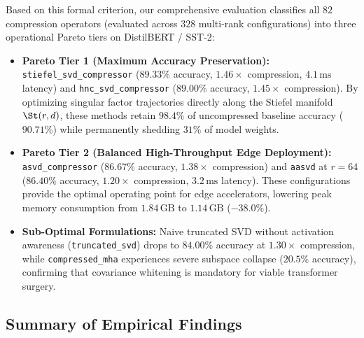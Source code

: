 Based on this formal criterion, our comprehensive evaluation classifies all $82$ compression operators (evaluated across $328$ multi-rank configurations) into three operational Pareto tiers on DistilBERT / SST-2:
\begin{itemize}
    \item \textbf{Pareto Tier 1 (Maximum Accuracy Preservation):} \texttt{stiefel\_svd\_compressor} ($89.33\%$ accuracy, $1.46\times$ compression, $4.1\,\text{ms}$ latency) and \texttt{hnc\_svd\_compressor} ($89.00\%$ accuracy, $1.45\times$ compression). By optimizing singular factor trajectories directly along the Stiefel manifold $\St(r, d)$, these methods retain $98.4\%$ of uncompressed baseline accuracy ($90.71\%$) while permanently shedding $31\%$ of model weights.
    \item \textbf{Pareto Tier 2 (Balanced High-Throughput Edge Deployment):} \texttt{asvd\_compressor} ($86.67\%$ accuracy, $1.38\times$ compression) and \texttt{aasvd} at $r=64$ ($86.40\%$ accuracy, $1.20\times$ compression, $3.2\,\text{ms}$ latency). These configurations provide the optimal operating point for edge accelerators, lowering peak memory consumption from $1.84\,\text{GB}$ to $1.14\,\text{GB}$ ($-38.0\%$).
    \item \textbf{Sub-Optimal Formulations:} Naive truncated SVD without activation awareness (\texttt{truncated\_svd}) drops to $84.00\%$ accuracy at $1.30\times$ compression, while \texttt{compressed\_mha} experiences severe subspace collapse ($20.5\%$ accuracy), confirming that covariance whitening is mandatory for viable transformer surgery.
\end{itemize}

\subsection{Summary of Empirical Findings}
\label{sec:results_summary}

